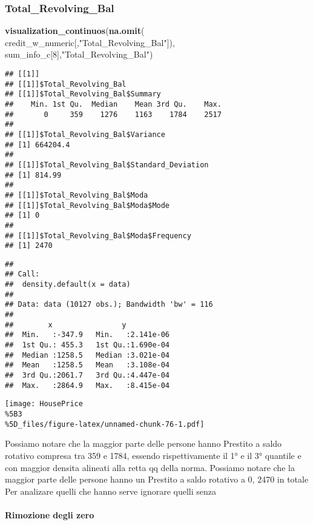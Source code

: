 \documentclass[
]{article}
\newenvironment{Shaded}{\begin{snugshade}}{\end{snugshade}}
\newcommand{\DecValTok}[1]{\textcolor[rgb]{0.00,0.00,0.81}{#1}}
\newcommand{\FunctionTok}[1]{\textcolor[rgb]{0.13,0.29,0.53}{\textbf{#1}}}
\newcommand{\NormalTok}[1]{#1}
\newcommand{\StringTok}[1]{\textcolor[rgb]{0.31,0.60,0.02}{#1}}
\begin{document}
\subsubsection{Total\_Revolving\_Bal}\label{total_revolving_bal}

\begin{Shaded}
\begin{Highlighting}[]
\FunctionTok{visualization\_continuos}\NormalTok{(}\FunctionTok{na.omit}\NormalTok{(}
\NormalTok{  credit\_w\_numeric[,}\StringTok{"Total\_Revolving\_Bal"}\NormalTok{]), sum\_info\_c[}\DecValTok{8}\NormalTok{],}\StringTok{"Total\_Revolving\_Bal"}\NormalTok{)}
\end{Highlighting}
\end{Shaded}

\begin{verbatim}
## [[1]]
## [[1]]$Total_Revolving_Bal
## [[1]]$Total_Revolving_Bal$Summary
##    Min. 1st Qu.  Median    Mean 3rd Qu.    Max. 
##       0     359    1276    1163    1784    2517 
## 
## [[1]]$Total_Revolving_Bal$Variance
## [1] 664204.4
## 
## [[1]]$Total_Revolving_Bal$Standard_Deviation
## [1] 814.99
## 
## [[1]]$Total_Revolving_Bal$Moda
## [[1]]$Total_Revolving_Bal$Moda$Mode
## [1] 0
## 
## [[1]]$Total_Revolving_Bal$Moda$Frequency
## [1] 2470
\end{verbatim}

\begin{verbatim}
## 
## Call:
##  density.default(x = data)
## 
## Data: data (10127 obs.); Bandwidth 'bw' = 116
## 
##        x                y            
##  Min.   :-347.9   Min.   :2.141e-06  
##  1st Qu.: 455.3   1st Qu.:1.690e-04  
##  Median :1258.5   Median :3.021e-04  
##  Mean   :1258.5   Mean   :3.108e-04  
##  3rd Qu.:2061.7   3rd Qu.:4.447e-04  
##  Max.   :2864.9   Max.   :8.415e-04
\end{verbatim}

\texttt{[image: HousePrice\\\%5B3\\\%5D\_files/figure-latex/unnamed-chunk-76-1.pdf]}

Possiamo notare che la maggior parte delle persone hanno Prestito a
saldo rotativo compresa tra 359 e 1784, essendo rispettivamente il 1° e
il 3° quantile e con maggior densita alineati alla retta qq della norma.
Possiamo notare che la maggior parte delle persone hanno un Prestito a
saldo rotativo a 0, 2470 in totale Per analizare quelli che hanno serve
ignorare quelli senza

\paragraph{Rimozione degli zero}\label{rimozione-degli-zero-15}
\end{document}
